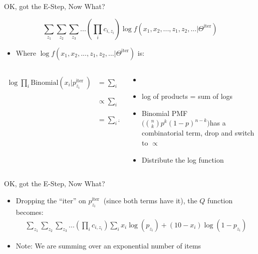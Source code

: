 \documentclass[aspectratio=169]{beamer}
\begin{document}
\begin{frame}{OK, got the E-Step, Now What?}

		$$\sum_{z_1} \sum_{z_2 } \sum_{z_3}... \left( \prod_i c_{i, z_i} \right) \log f (x_1, x_2, ..., z_1, z_2, ... | \Theta^{\textrm{iter}})$$
	\begin{itemize}
	\item Where $\log f (x_1, x_2, ..., z_1, z_2, ... | \Theta^{\textrm{iter}})$ is:
	\end{itemize}
\begin{columns}[T]
\begin{column}{0.6\textwidth}
	\begin{align}
	\log \prod_i \textrm{Binomial} (x_i | p_{z_i}^{\textrm{iter }}) &=
		\sum_i \log \textrm{Binomial} (x_i | p_{z_i}^{\textrm{iter }}) \nonumber \\ &\propto
		\sum_i \log \left( 
			(p_{z_i}^{\textrm{iter }})^{x_i} \times (1 - p_{z_i}^{\textrm{iter }})^{10 - x_i} \right) \nonumber \\
			&=	\sum_i x_i \log (p_{z_i}^{\textrm{iter }}) + (10 - x_i) \log (1 - p_{z_i}^{\textrm{iter }}) \nonumber
	\end{align}
\end{column}
\begin{column}{0.4\textwidth}
{\footnotesize
	\begin{itemize}
	\item[]
	\item log of products = sum of logs
	\item Binomial PMF $\Big( {n \choose k } p^k(1-p)^{n-k}\Big)$has a combinatorial term, drop and switch to $\propto$
	\item Distribute the log function
	\end{itemize}
	}
\end{column}
\end{columns}
\end{frame}
\begin{frame}{OK, got the E-Step, Now What?}

	\begin{itemize}
	\item Dropping the ``iter'' on $p_{z_i}^{\textrm{iter }}$ (since both terms have it), the $Q$ function becomes:
	\begin{align}
		\sum_{z_1} \sum_{z_2 } \sum_{z_3}... \left( \prod_i c_{i, z_i} \right) \sum_i x_i \log (p_{z_i}) + (10 - x_i) \log (1 - p_{z_i}) \nonumber
	\end{align}
	\item Note: We are summing over an exponential number of items
	\end{itemize}\end{frame}
\end{document}
